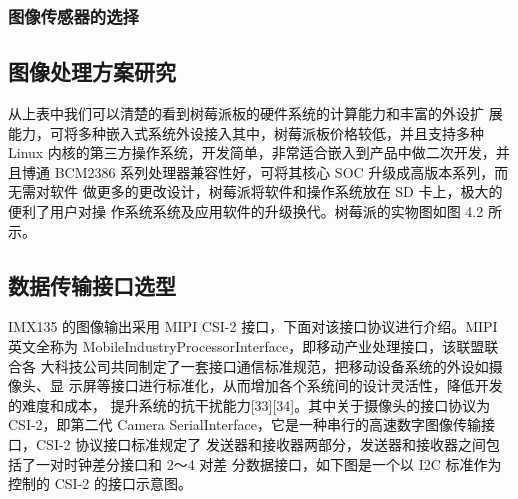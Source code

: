 \subsubsection{图像传感器的选择}



\subsection{图像处理方案研究}

从上表中我们可以清楚的看到树莓派板的硬件系统的计算能力和丰富的外设扩 展能力，可将多种嵌入式系统外设接入其中，树莓派板价格较低，并且支持多种 Linux 内核的第三方操作系统，开发简单，非常适合嵌入到产品中做二次开发，并且博通 BCM2386 系列处理器兼容性好，可将其核心 SOC 升级成高版本系列，而无需对软件 做更多的更改设计，树莓派将软件和操作系统放在 SD 卡上，极大的便利了用户对操 作系统系统及应用软件的升级换代。树莓派的实物图如图 4.2 所示。

\subsection{数据传输接口选型}
IMX135 的图像输出采用 MIPI CSI-2 接口，下面对该接口协议进行介绍。MIPI 英文全称为 MobileIndustryProcessorInterface，即移动产业处理接口，该联盟联合各 大科技公司共同制定了一套接口通信标准规范，把移动设备系统的外设如摄像头、显 示屏等接口进行标准化，从而增加各个系统间的设计灵活性，降低开发的难度和成本， 提升系统的抗干扰能力[33][34]。其中关于摄像头的接口协议为 CSI-2，即第二代 Camera SerialInterface，它是一种串行的高速数字图像传输接口，CSI-2 协议接口标准规定了 发送器和接收器两部分，发送器和接收器之间包括了一对时钟差分接口和 2～4 对差 分数据接口，如下图是一个以 I2C 标准作为控制的 CSI-2 的接口示意图。